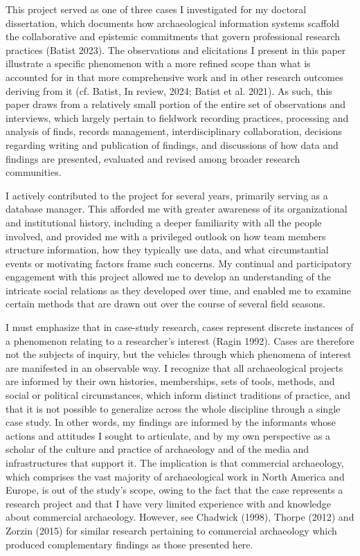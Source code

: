 \documentclass[
]{article}
\begin{document}
This project served as one of three cases I investigated for my doctoral
dissertation, which documents how archaeological information systems
scaffold the collaborative and epistemic commitments that govern
professional research practices (Batist 2023). The observations and
elicitations I present in this paper illustrate a specific phenomenon
with a more refined scope than what is accounted for in that more
comprehensive work and in other research outcomes deriving from it (cf.
Batist, In review, 2024; Batist et al. 2021). As such, this paper draws
from a relatively small portion of the entire set of observations and
interviews, which largely pertain to fieldwork recording practices,
processing and analysis of finds, records management, interdisciplinary
collaboration, decisions regarding writing and publication of findings,
and discussions of how data and findings are presented, evaluated and
revised among broader research communities.

I actively contributed to the project for several years, primarily
serving as a database manager. This afforded me with greater awareness
of its organizational and institutional history, including a deeper
familiarity with all the people involved, and provided me with a
privileged outlook on how team members structure information, how they
typically use data, and what circumstantial events or motivating factors
frame such concerns. My continual and participatory engagement with this
project allowed me to develop an understanding of the intricate social
relations as they developed over time, and enabled me to examine certain
methods that are drawn out over the course of several field seasons.

I must emphasize that in case-study research, cases represent discrete
instances of a phenomenon relating to a researcher's interest (Ragin
1992). Cases are therefore not the subjects of inquiry, but the vehicles
through which phenomena of interest are manifested in an observable way.
I recognize that all archaeological projects are informed by their own
histories, memberships, sets of tools, methods, and social or political
circumstances, which inform distinct traditions of practice, and that it
is not possible to generalize across the whole discipline through a
single case study. In other words, my findings are informed by the
informants whose actions and attitudes I sought to articulate, and by my
own perspective as a scholar of the culture and practice of archaeology
and of the media and infrastructures that support it. The implication is
that commercial archaeology, which comprises the vast majority of
archaeological work in North America and Europe, is out of the study's
scope, owing to the fact that the case represents a research project and
that I have very limited experience with and knowledge about commercial
archaeology. However, see Chadwick (1998), Thorpe (2012) and Zorzin
(2015) for similar research pertaining to commercial archaeology which
produced complementary findings as those presented here.
\end{document}

